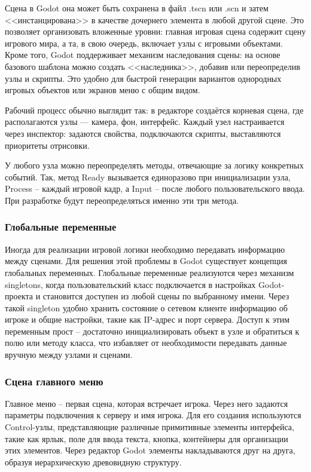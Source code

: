         Сцена в Godot она может быть сохранена в файл .tscn или .scn и затем <<инстанцирована>> в качестве дочернего элемента в любой другой сцене. Это позволяет организовать вложенные уровни: главная игровая сцена содержит сцену игрового мира, а та, в свою очередь, включает узлы с игровыми объектами. Кроме того, Godot поддерживает механизм наследования сцены: на основе базового шаблона можно создать <<наследника>>, добавив или переопределив узлы и скрипты. Это удобно для быстрой генерации вариантов однородных игровых объектов или экранов меню с общим видом.

        Рабочий процесс обычно выглядит так: в редакторе создаётся корневая сцена, где располагаются узлы — камера, фон, интерфейс. Каждый узел настраивается через инспектор: задаются свойства, подключаются скрипты, выставляются приоритеты отрисовки.

        У любого узла можно переопределять методы, отвечающие за логику конкретных событий. Так, метод Ready вызывается единоразово при инициализации узла, Process -- каждый игровой кадр, а Input -- после любого пользовательского ввода. При разработке будут переопределяться именно эти три метода.

        \subsubsection{Глобальные переменные}

        Иногда для реализации игровой логики необходимо передавать информацию между сценами. Для решения этой проблемы в Godot существует концепция глобальных переменных. Глобальные переменные реализуются через механизм singletons, когда пользовательский класс подключается в настройках Godot-проекта и становится доступен из любой сцены по выбранному имени. Через такой singleton удобно хранить состояние о сетевом клиенте информацию об игроке и общие настройки, такие как IP-адрес и порт сервера. Доступ к этим переменным прост -- достаточно инициализировать объект в узле и обратиться к полю или методу класса, что избавляет от необходимости передавать данные вручную между узлами и сценами.

        \subsubsection{Сцена главного меню}

        Главное меню -- первая сцена, которая встречает игрока. Через него задаются параметры подключения к серверу и имя игрока. Для его создания используются Control-узлы, представляющие различные примитивные элементы интерфейса, такие как ярлык, поле для ввода текста, кнопка, контейнеры для организации этих элементов. Через редактор Godot элементы накладываются друг на друга, образуя иерархическую древовидную структуру.

